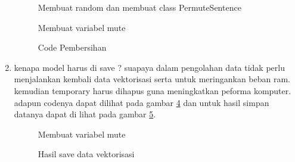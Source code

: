\begin{enumerate}
\begin{figure}[!htbp]
      \caption{Membuat random dan membuat class PermuteSentence}
      \label{c99}
      \end{figure}

\begin{figure}[!htbp]
      \caption{Membuat variabel mute}
      \label{c100}
      \end{figure}

\begin{figure}[!htbp]
      \caption{Code Pembersihan}
      \label{c101}
      \end{figure}

\item kenapa model harus di save ? suapaya dalam pengolahan data tidak perlu menjalankan kembali data vektorisasi serta untuk meringankan beban ram. kemudian temporary harus dihapus guna meningkatkan peforma komputer. adapun codenya dapat dilihat pada gambar \ref{c102} dan untuk hasil simpan datanya dapat di lihat pada gambar \ref{c103}.

\begin{figure}[!htbp]
      \caption{Membuat variabel mute}
      \label{c102}
      \end{figure}

\begin{figure}[!htbp]
      \caption{Hasil save data vektorisasi}
      \label{c103}
      \end{figure}


\end{enumerate}


